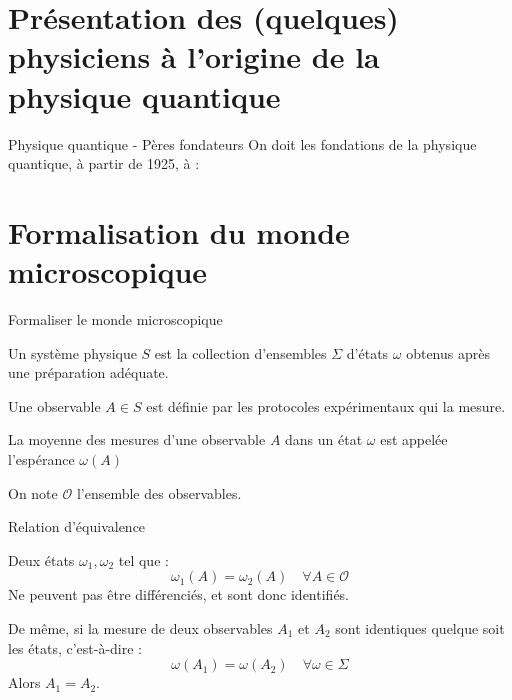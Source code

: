 \documentclass[11pt, xcolor=table]{beamer}
\begin{document}

\section{Présentation des (quelques) physiciens à l'origine de la physique quantique}

\begin{frame}{Physique quantique - Pères fondateurs}
    On doit les fondations de la physique quantique, à partir de 1925, à :


\end{frame}

\section{Formalisation du monde microscopique}

\begin{frame}{Formaliser le monde microscopique}
    \begin{mydef}
        Un système physique $S$ est la collection d'ensembles $\Sigma$ d'états $\omega$ obtenus après une préparation adéquate.

        Une observable $A \in S$ est définie par les protocoles expérimentaux qui la mesure.

        La moyenne des mesures d'une observable $A$ dans un état $\omega$ est appelée l'espérance $\omega(A)$

        On note $\mathcal{O}$ l'ensemble des observables.
    \end{mydef}
\end{frame}

\begin{frame}{Relation d'équivalence}
    \begin{myth}
        Deux états $\omega_1, \omega_2$ tel que :
        \[
            \omega_1 ( A) = \omega_2(A) \quad \forall A \in \mathcal{O}
        \]
        Ne peuvent pas être différenciés, et sont donc identifiés.
        
        De même, si la mesure de deux observables $A_1$ et $A_2$ sont identiques quelque soit les états, c'est-à-dire :
        \[
            \omega(A_1) = \omega(A_2) \quad \forall \omega \in \Sigma
        \]
        Alors $A_1 = A_2$.
    \end{myth}
\end{frame}
\end{document}
